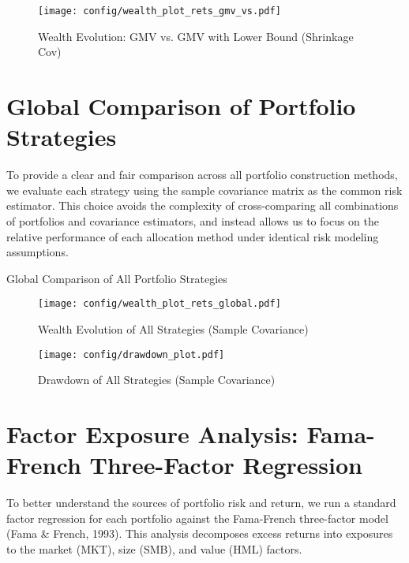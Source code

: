 \documentclass{article}
\begin{document}
\begin{figure}[htbp]
    \centering
    \texttt{[image: config/wealth\_plot\_rets\_gmv\_vs.pdf]}
    \caption{Wealth Evolution: GMV vs. GMV with Lower Bound (Shrinkage Cov)}
    \label{fig:wealth_gmv_vs}
\end{figure}

\newpage
\section{Global Comparison of Portfolio Strategies }

To provide a clear and fair comparison across all portfolio construction methods, we evaluate each strategy using the sample covariance matrix as the common risk estimator. This choice avoids the complexity of cross-comparing all combinations of portfolios and covariance estimators, and instead allows us to focus on the relative performance of each allocation method under identical risk modeling assumptions.

\begin{table}[htbp]
\centering
\caption{Global Comparison of All Portfolio Strategies}
\label{tab:stats_global}
\begin{adjustbox}{max width=\textwidth}
    
\end{adjustbox}
\end{table}


\begin{figure}[htbp]
    \centering
    \texttt{[image: config/wealth\_plot\_rets\_global.pdf]}
    \caption{Wealth Evolution of All Strategies (Sample Covariance)}
    \label{fig:wealth_global}
\end{figure}

\begin{figure}[htbp]
    \centering
    \texttt{[image: config/drawdown\_plot.pdf]}
    \caption{Drawdown of All Strategies (Sample Covariance)}
    \label{fig:drawdown_global}
\end{figure}


\newpage

\section{Factor Exposure Analysis: Fama-French Three-Factor Regression}

To better understand the sources of portfolio risk and return, we run a standard factor regression for each portfolio against the Fama-French three-factor model (Fama \& French, 1993). This analysis decomposes excess returns into exposures to the market (MKT), size (SMB), and value (HML) factors.
\end{document}
